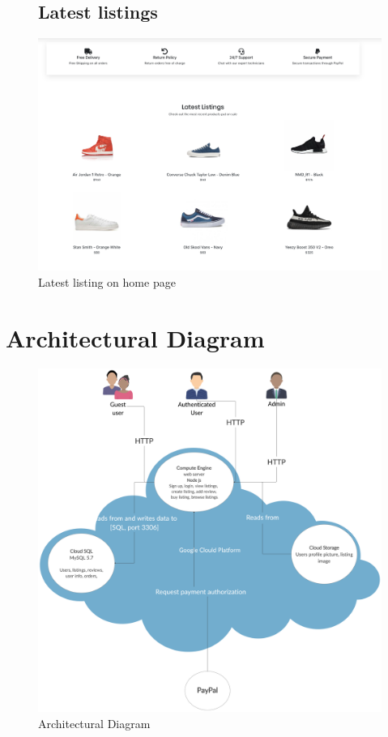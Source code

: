 \documentclass[11pt]{article}
\begin{document}
\begin{figure}[ht!]
    \subsection{Latest listings}
    \centering
    \includegraphics[width=\textwidth,height=0.3\paperheight,keepaspectratio]{Diagrams/External_Interfaces/Latest_Listings.png} 
    \caption{Latest listing on home page}
    \label{fig: Latest listings}
\end{figure}
\clearpage

\section{Architectural Diagram}
\begin{figure}[ht!]
    \centering
    \includegraphics[width=\textwidth,height=0.6\paperheight]{Diagrams/Class/Architectural_diagram.png}
    \caption{Architectural Diagram}
    \label{fig: Architectural Diagram}
\end{figure}
\end{document}
